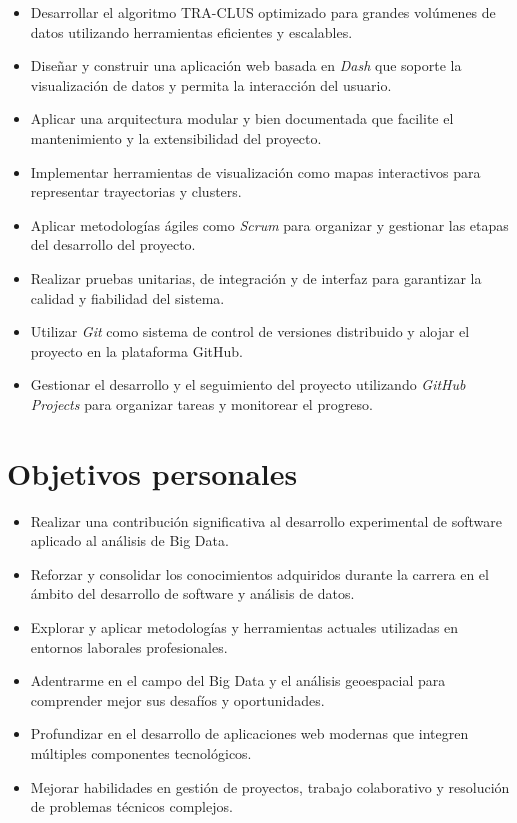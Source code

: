 \begin{itemize}
    \item Desarrollar el algoritmo TRA-CLUS optimizado para grandes volúmenes de datos utilizando herramientas eficientes y escalables.
    \item Diseñar y construir una aplicación web basada en \textit{Dash} que soporte la visualización de datos y permita la interacción del usuario.
    \item Aplicar una arquitectura modular y bien documentada que facilite el mantenimiento y la extensibilidad del proyecto.
    \item Implementar herramientas de visualización como mapas interactivos para representar trayectorias y clusters.
    \item Aplicar metodologías ágiles como \textit{Scrum} para organizar y gestionar las etapas del desarrollo del proyecto.
    \item Realizar pruebas unitarias, de integración y de interfaz para garantizar la calidad y fiabilidad del sistema.
    \item Utilizar \textit{Git} como sistema de control de versiones distribuido y alojar el proyecto en la plataforma GitHub.
    \item Gestionar el desarrollo y el seguimiento del proyecto utilizando \textit{GitHub Projects} para organizar tareas y monitorear el progreso.
\end{itemize}

\section{Objetivos personales}\label{objetivos-personales}

\begin{itemize}
    \item Realizar una contribución significativa al desarrollo experimental de software aplicado al análisis de Big Data.
    \item Reforzar y consolidar los conocimientos adquiridos durante la carrera en el ámbito del desarrollo de software y análisis de datos.
    \item Explorar y aplicar metodologías y herramientas actuales utilizadas en entornos laborales profesionales.
    \item Adentrarme en el campo del Big Data y el análisis geoespacial para comprender mejor sus desafíos y oportunidades.
    \item Profundizar en el desarrollo de aplicaciones web modernas que integren múltiples componentes tecnológicos.
    \item Mejorar habilidades en gestión de proyectos, trabajo colaborativo y resolución de problemas técnicos complejos.
\end{itemize}

